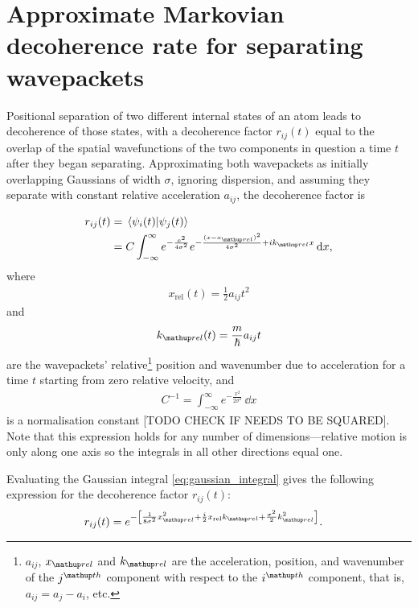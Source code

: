 \section{Approximate Markovian decoherence rate for separating wavepackets}

Positional separation of two different internal states of an atom leads to decoherence of those states, with a decoherence factor $r_{ij}(t)$ equal to the overlap of the spatial wavefunctions of the two components in question a time $t$ after they began separating. Approximating both wavepackets as initially overlapping Gaussians of width $\sigma$, ignoring dispersion, and assuming they separate with constant relative acceleration $a_{ij}$, the decoherence factor is

\begin{align}
r_{ij}(t) &= \braket{\psi_i(t)}{\psi_j(t)}\\
 &= C \int_{-\infty}^{\infty} e^{-\frac{x^2}{4\sigma^2}}e^{-\frac{(x-x_\up{rel})^2}{4\sigma^2} + ik_\up{rel}x}\,\dd x,\label{eq:gaussian_integral}
\end{align}
where
\begin{align}
x_{\mathrm{rel}}(t) = \frac12a_{ij}t^2
\end{align}
and
\begin{align}
k_\up{rel}(t) = \frac m \hbar a_{ij} t
\end{align}
are the wavepackets' relative\footnote{$a_{ij}$, $x_\up{rel}$ and $k_\up{rel}$ are the acceleration, position, and wavenumber of the $j^\up{th}$ component with respect to the $i^\up{th}$ component, that is, $a_{ij} = a_j - a_i$, etc.} position and wavenumber due to acceleration for a time $t$ starting from zero relative velocity, and
\begin{align}
C^{-1}=\int_{-\infty}^\infty e^{-\frac{x^2}{2\sigma^2}}\,\dd x\label{supp:eq:Cdef}
\end{align}
is a normalisation constant [TODO CHECK IF NEEDS TO BE SQUARED]. Note that this expression holds for any number of dimensions---relative motion is only along one axis so the integrals in all other directions equal one.

Evaluating the Gaussian integral \eqref{eq:gaussian_integral} gives the following expression for the decoherence factor $r_{ij}(t)$:
\begin{align}
r_{ij}(t)&= e^{-\left[
        \frac{1} {8\sigma^2} x_\up{rel}^2
      + \frac i2 x_{\mathrm{rel}} k_\up{rel}
      + \frac{\sigma^2}{2} k_\up{rel}^2
      \right]}\label{eq:decoherence_factor}.
\end{align}


